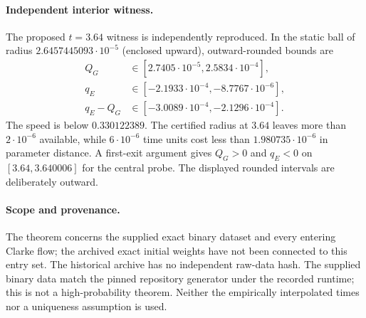 \paragraph{Independent interior witness.}
The proposed $t=3.64$ witness is independently reproduced. In the static
ball of radius $2.6457445093\cdot10^{-5}$ (enclosed upward), outward-rounded
bounds are
\begin{align*}
 Q_G&\in[2.7405\cdot10^{-5},2.5834\cdot10^{-4}],\\
 q_E&\in[-2.1933\cdot10^{-4},-8.7767\cdot10^{-6}],\\
 q_E-Q_G&\in[-3.0089\cdot10^{-4},-2.1296\cdot10^{-4}].
\end{align*}
The speed is below $0.330122389$. The certified radius at $3.64$ leaves
more than $2\cdot10^{-6}$ available, while $6\cdot10^{-6}$ time units cost
less than $1.980735\cdot10^{-6}$ in parameter distance. A first-exit
argument gives $Q_G>0$ and $q_E<0$ on $[3.64,3.640006]$ for the central
probe. The displayed rounded intervals are deliberately outward.

\paragraph{Scope and provenance.}
The theorem concerns the supplied exact binary dataset and every entering
Clarke flow; the archived exact initial weights have not been connected to
this entry set. The historical archive has no independent raw-data hash.
The supplied binary data match the pinned repository generator under the
recorded runtime; this is not a high-probability theorem. Neither the
empirically interpolated times nor a uniqueness assumption is used.

